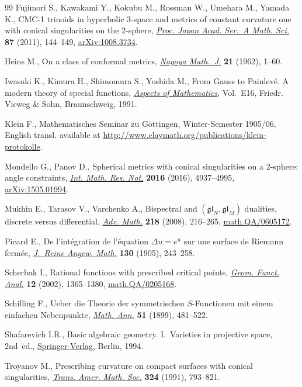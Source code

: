 \documentclass[pdftex]{sigma}
\numberwithin{equation}{section}
\begin{document}
\begin{thebibliography}{99}
Fujimori S., Kawakami Y., Kokubu M., Rossman W., Umehara M., Yamada K., C{MC}-1
 trinoids in hyperbolic 3-space and metrics of constant curvature one with
 conical singularities on the 2-sphere, \href{https://doi.org/10.3792/pjaa.87.144}{\textit{Proc. Japan Acad. Ser.~A Math.
 Sci.}} \textbf{87} (2011), 144--149, \href{https://arxiv.org/abs/1008.3734}{arXiv:1008.3734}.

Heins M., On a class of conformal metrics, \href{https://doi.org/10.1017/S002776300002376X}{\textit{Nagoya Math.~J.}} \textbf{21}
 (1962), 1--60.

Iwasaki K., Kimura H., Shimomura S., Yoshida M., From {G}auss to {P}ainlev\'e.
 A modern theory of special functions, \href{https://doi.org/10.1007/978-3-322-90163-7}{\textit{Aspects of Mathematics}}, Vol.~E16, Friedr. Vieweg \& Sohn, Braunschweig, 1991.

Klein F., Mathematisches Seminar zu G\"ottingen, Winter-Semester 1905/06,
 {E}nglish transl. available at
 \url{http://www.claymath.org/publications/klein-protokolle}.

Mondello G., Panov D., Spherical metrics with conical singularities on a
 2-sphere: angle constraints, \href{https://doi.org/10.1093/imrn/rnv300}{\textit{Int. Math. Res. Not.}} \textbf{2016}
 (2016), 4937--4995, \href{https://arxiv.org/abs/1505.01994}{arXiv:1505.01994}.

Mukhin E., Tarasov V., Varchenko A., Bispectral and
 {$({\mathfrak{gl}}_N,{\mathfrak{gl}}_M)$} dualities, discrete versus
 differential, \href{https://doi.org/10.1016/j.aim.2007.11.022}{\textit{Adv. Math.}} \textbf{218} (2008), 216--265,
 \href{https://arxiv.org/abs/math.QA/0605172}{math.QA/0605172}.

Picard E., De l'int\'egration de l'\'equation {$\Delta u=e^u$} sur une surface
 de {R}iemann ferm\'ee, \href{https://doi.org/10.1515/crll.1905.130.243}{\textit{J.~Reine Angew. Math.}} \textbf{130} (1905),
 243--258.

Scherbak I., Rational functions with prescribed critical points, \href{https://doi.org/10.1007/s00039-002-1365-4}{\textit{Geom.
 Funct. Anal.}} \textbf{12} (2002), 1365--1380, \href{https://arxiv.org/abs/math.QA/0205168}{math.QA/0205168}.

Schilling F., Ueber die {T}heorie der symmetrischen {$S$}-{F}unctionen mit
 einem einfachen {N}ebenpunkte, \href{https://doi.org/10.1007/BF01453704}{\textit{Math. Ann.}} \textbf{51} (1899),
 481--522.

Shafarevich I.R., Basic algebraic geometry. I.~Varieties in projective space,
 2nd~ed., \href{https://doi.org/10.1007/978-3-642-57908-0}{Springer-Verlag}, Berlin, 1994.

Troyanov M., Prescribing curvature on compact surfaces with conical
 singularities, \href{https://doi.org/10.2307/2001742}{\textit{Trans. Amer. Math. Soc.}} \textbf{324} (1991),
 793--821.

\end{thebibliography}\LastPageEnding
\end{document}
